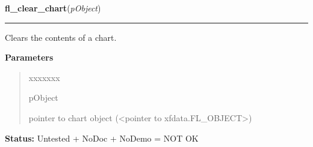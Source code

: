    \label{xformslib:library:fl_clear_chart}

    \vspace{0.5ex}

\hspace{.8\funcindent}\begin{boxedminipage}{\funcwidth}

    \raggedright \textbf{fl\_clear\_chart}(\textit{pObject})

    \vspace{-1.5ex}

    \rule{\textwidth}{0.5\fboxrule}
\setlength{\parskip}{2ex}
    Clears the contents of a chart.

\setlength{\parskip}{1ex}
      \textbf{Parameters}
      \vspace{-1ex}

      \begin{quote}
        \begin{Ventry}{xxxxxxx}

          \item[pObject]

          pointer to chart object ({\textless}pointer to 
          xfdata.FL\_OBJECT{\textgreater})

        \end{Ventry}

      \end{quote}

\textbf{Status:} Untested + NoDoc + NoDemo = NOT OK



    \end{boxedminipage}

    \label{xformslib:library:fl_add_chart_value}

    \vspace{0.5ex}

